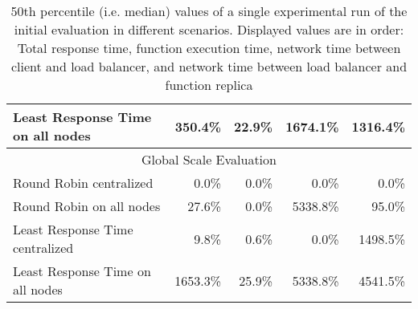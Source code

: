 \begin{table}[]
\begin{tabular}{lrrrr}
Least Response Time on all nodes & 350.4\%                          & 22.9\%                           & 1674.1\%                               & 1316.4\%                               \\ \hline
\multicolumn{5}{c}{Global Scale Evaluation}                                                                                                                                              \\ \hline
Round Robin centralized          & 0.0\%                            & 0.0\%                            & 0.0\%                                  & 0.0\%                                  \\
Round Robin on all nodes         & 27.6\%                           & 0.0\%                            & 5338.8\%                               & 95.0\%                                 \\
Least Response Time centralized  & 9.8\%                            & 0.6\%                            & 0.0\%                                  & 1498.5\%                               \\
Least Response Time on all nodes & 1653.3\%                         & 25.9\%                           & 5338.8\%                               & 4541.5\%                               \\ \hline
\end{tabular}
\caption{50th percentile (i.e. median) values of a single experimental run of the initial evaluation in different scenarios. Displayed values are in order: Total response time, function execution time, network time between client and load balancer, and network time between load balancer and function replica}
\label{tab:initial_eval_results_q50}
\end{table}